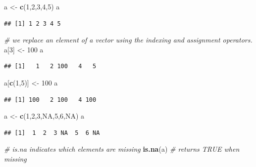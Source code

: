 \documentclass[]{book}
\newenvironment{Shaded}{\begin{snugshade}}{\end{snugshade}}
\newcommand{\KeywordTok}[1]{\textcolor[rgb]{0.13,0.29,0.53}{\textbf{{#1}}}}
\newcommand{\DecValTok}[1]{\textcolor[rgb]{0.00,0.00,0.81}{{#1}}}
\newcommand{\StringTok}[1]{\textcolor[rgb]{0.31,0.60,0.02}{{#1}}}
\newcommand{\CommentTok}[1]{\textcolor[rgb]{0.56,0.35,0.01}{\textit{{#1}}}}
\newcommand{\OtherTok}[1]{\textcolor[rgb]{0.56,0.35,0.01}{{#1}}}
\newcommand{\NormalTok}[1]{{#1}}
\begin{document}
\begin{Shaded}
\begin{Highlighting}[]
\NormalTok{a <-}\StringTok{ }\KeywordTok{c}\NormalTok{(}\DecValTok{1}\NormalTok{,}\DecValTok{2}\NormalTok{,}\DecValTok{3}\NormalTok{,}\DecValTok{4}\NormalTok{,}\DecValTok{5}\NormalTok{)}
\NormalTok{a}
\end{Highlighting}
\end{Shaded}

\begin{verbatim}
## [1] 1 2 3 4 5
\end{verbatim}

\begin{Shaded}
\begin{Highlighting}[]
\CommentTok{# we replace an element of a vector using the indexing and assignment operators. }
\NormalTok{a[}\DecValTok{3}\NormalTok{] <-}\StringTok{ }\DecValTok{100}
\NormalTok{a}
\end{Highlighting}
\end{Shaded}

\begin{verbatim}
## [1]   1   2 100   4   5
\end{verbatim}

\begin{Shaded}
\begin{Highlighting}[]
\NormalTok{a[}\KeywordTok{c}\NormalTok{(}\DecValTok{1}\NormalTok{,}\DecValTok{5}\NormalTok{)] <-}\StringTok{ }\DecValTok{100}
\NormalTok{a}
\end{Highlighting}
\end{Shaded}

\begin{verbatim}
## [1] 100   2 100   4 100
\end{verbatim}

\begin{Shaded}
\begin{Highlighting}[]
\NormalTok{a <-}\StringTok{ }\KeywordTok{c}\NormalTok{(}\DecValTok{1}\NormalTok{,}\DecValTok{2}\NormalTok{,}\DecValTok{3}\NormalTok{,}\OtherTok{NA}\NormalTok{,}\DecValTok{5}\NormalTok{,}\DecValTok{6}\NormalTok{,}\OtherTok{NA}\NormalTok{)}
\NormalTok{a}
\end{Highlighting}
\end{Shaded}

\begin{verbatim}
## [1]  1  2  3 NA  5  6 NA
\end{verbatim}

\begin{Shaded}
\begin{Highlighting}[]
\CommentTok{# is.na indicates which elements are missing}
\KeywordTok{is.na}\NormalTok{(a)  }\CommentTok{# returns TRUE when missing}
\end{Highlighting}
\end{Shaded}
\end{document}
